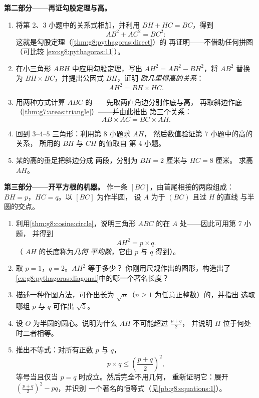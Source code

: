 \begin{problem}[{周末问题——直角三角形的高：
$AB^2 = BH \times BC$，$AH^2 = BH \times HC$，勾股定理的第二种证明，
以及开平方根的机器}]
\medskip
\noindent\textbf{第二部分——再证勾股定理与高。}
\begin{enumerate}[resume]
  \item 将第 2、3 小题中的关系式相加，并利用
        $BH + HC = BC$，得到
        \[
        AB^2 + AC^2 = BC^2 :
        \]
        这就是勾股定理（\cref{thm:g8:pythagoras:direct}）的
        再证明——不借助任何拼图（可比较
        \cref{exo:g8:pythagoras:11}）。
  \item 在小三角形 $ABH$ 中应用勾股定理，写出
        $AH^2 = AB^2 - BH^2$，将 $AB^2$ 替换为
        $BH \times BC$，并提出公因式 $BH$，证明
        \emph{欧几里得高的关系}：
        \[
        AH^2 = BH \times HC .
        \]
  \item 用两种方式计算 $ABC$ 的——先取两直角边分别作底与高，
        再取斜边作底
        （\cref{thm:g7:areas:triangle}）——并由此推出
        第三个关系：
        \[
        AB \times AC = BC \times AH .
        \]
  \item 回到 $3$--$4$--$5$ 三角形：利用第 8 小题求 $AH$，
        然后数值验证第 7 小题中的高的关系，
        所用的 $BH$ 与 $CH$ 的值取自
        第 4 小题。
  \item 某的高的垂足把斜边分成
        两段，分别为 $BH = 2$ 厘米与 $HC = 8$ 厘米。
        求高 $AH$。
\end{enumerate}

\medskip
\noindent\textbf{第三部分——开平方根的机器。}
作一条 $[BC]$，由首尾相接的两段组成：
$BH = p$，$HC = q$。以 $[BC]$ 为作半圆，
设 $A$ 为于 $(BC)$ 且过 $H$ 的直线
与半圆的交点。
\begin{enumerate}[resume]
  \item 利用\cref{thm:g8:cosine:circle}，说明三角形
        $ABC$ 的在 $A$ 处——因此可用第 7 小题，
        并得到
        \[
        AH^2 = p \times q .
        \]
        （ $AH$ 的长度称为\emph{几何
        平均数}，它由 $p$ 与 $q$ 得到）。
  \item 取 $p = 1$，$q = 2$。$AH^2$ 等于多少？
        你刚用尺规作出的图形，构造出了
        \cref{ex:g8:pythagoras:diagonal}中的哪一个著名长度？
  \item 描述一种作图方法，可作出长为
        $\sqrt n$（$n \geq 1$ 为任意正整数）的，并指出
        选取哪组 $p$ 与 $q$ 可作出 $\sqrt 5$。
  \item 设 $O$ 为半圆的圆心。说明为什么
        $AH$ 不可能超过 $\frac{p + q}{2}$，
        并说明 $H$ 位于何处时二者相等。
  \item 推出不等式：对所有正数
        $p$ 与 $q$，
        \[
        p \times q \leq \left(\frac{p + q}{2}\right)^2,
        \]
        等号当且仅当 $p = q$ 时成立。然后完全不用几何，
        重新证明它：展开
        $\left(\frac{p+q}{2}\right)^2 - p q$，并识别
        一个著名的恒等式（见\cref{pb:g8:equations:1}）。
\end{enumerate}
\end{problem}
